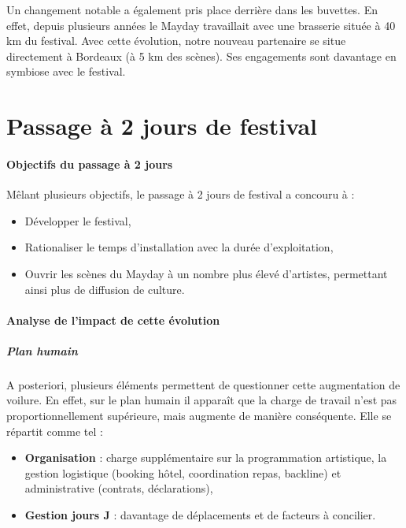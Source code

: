 \documentclass[12pt,a4paper]{report}
\begin{document}
Un changement notable a également pris place derrière dans les buvettes. En effet, depuis plusieurs années le Mayday travaillait avec une brasserie située à 40 km du festival. Avec cette évolution, notre nouveau partenaire se situe directement à Bordeaux (à 5 km des scènes). Ses engagements sont davantage en symbiose avec le festival.

\section{Passage à 2 jours de festival}

\paragraph{Objectifs du passage à 2 jours}
Mêlant plusieurs objectifs, le passage à 2 jours de festival a concouru à : 
\begin{itemize}
\item Développer le festival,
\item Rationaliser le temps d'installation avec la durée d'exploitation,
\item Ouvrir les scènes du Mayday à un nombre plus élevé d'artistes, permettant ainsi plus de diffusion de culture.
\end{itemize}

\paragraph{Analyse de l'impact de cette évolution}
\subparagraph{Plan humain}
A posteriori, plusieurs éléments permettent de questionner cette augmentation de voilure. En effet, sur le plan humain il apparaît que la charge de travail n'est pas proportionnellement supérieure, mais augmente de manière conséquente. Elle se répartit comme tel : 
\begin{itemize}
\item \textbf{Organisation} : charge supplémentaire sur la programmation artistique, la gestion logistique (booking hôtel, coordination repas, backline) et administrative (contrats, déclarations),
\item \textbf{Gestion jours J} : davantage de déplacements et de facteurs à concilier.
\end{itemize}
\end{document}
